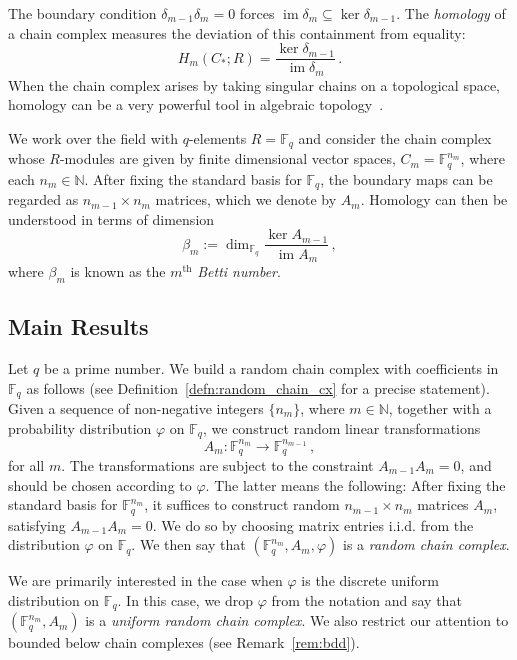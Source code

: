 \documentclass[3p,times]{elsarticle}
\theoremstyle{remark}
\DeclareMathOperator{\im}{\mathrm{im}}
\newcommand{\N}{\mathbb{N}}
\newcommand\Fqn[1]{\mathbb{F}_q^{#1}}
\newcommand{\lra}{\longrightarrow}
\begin{document}
The boundary condition $\delta_{m-1}\delta_m=0$ forces $\im \delta_m \subseteq \ker \delta_{m-1}$.
The {\em homology} of a chain complex measures the deviation of this containment
from equality:
\begin{equation*}
  \label{eqn:hom}
  H_m(C_*;R) = \frac{\ker \delta_{m-1}}{\im \delta_m} \, .
\end{equation*}
When the chain complex arises by taking singular chains on a topological
space, homology can be a very powerful tool in algebraic topology~\cite{hatcher2002algebraic}. 


We work over the field with $q$-elements $R = \Fqn{}$ and consider the chain
complex whose $R$-modules are given by finite dimensional vector spaces,  $C_m
= \Fqn{n_m}$, where each $n_m \in \mathbb{N}$. After fixing the standard
basis for $\Fqn{}$, the boundary
maps can be regarded as $n_{m-1}\times n_m $ matrices, which we denote by
$A_m$. Homology can then be understood in terms of dimension
\begin{equation*}
  \beta_m := \dim_{\Fqn{}} \frac{\ker A_{m-1}}{\im A_m} \, ,
  \label{eqn:betti_numbers}
\end{equation*}
where $\beta_m$ is known as the $m^\mathrm{th}$ {\em Betti number}.

\subsection*{Main Results}
Let $q$ be a prime number.  We
build a random chain complex with coefficients in $\Fqn{}$ as follows (see
Definition~\ref{defn:random_chain_cx} for a precise statement). Given a
sequence of non-negative integers $\{n_m\}$, where $m \in \N$, together with a probability
distribution $\varphi$ on $\Fqn{}$, we construct random
linear transformations 
\[
  A_m : \Fqn{n_m} \lra \Fqn{n_{m-1}} \, ,
\]
for all $m$. The transformations are subject to the constraint $A_{m-1} A_m =
0$, and should be chosen according to $\varphi$. The latter means the
following: After fixing the standard basis for $\Fqn{n_m}$, it suffices to
construct random $n_{m-1} \times n_m$ matrices $A_m$, satisfying $A_{m-1}A_m =
0$. We do so by choosing matrix entries i.i.d. from the distribution $\varphi$
on $\Fqn{}$. We then say that $(\Fqn{n_m}, A_m, \varphi)$ is a {\em random
chain complex}. 

We are primarily interested in the case when $\varphi$ is the discrete uniform
distribution on $\Fqn{}$. In this case, we drop $\varphi$ from the notation and
say that $(\Fqn{n_m}, A_m)$ is a {\em uniform random chain complex}. We also
restrict our attention to bounded below chain complexes (see Remark~\ref{rem:bdd}). 
\end{document}
